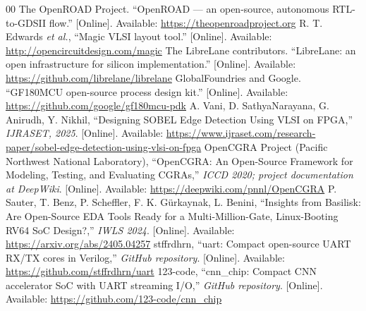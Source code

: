 \documentclass{ieeeaccess}
\begin{document}
\begin{thebibliography}{00}
 The OpenROAD Project. ``OpenROAD --- an open-source, autonomous RTL-to-GDSII flow.'' [Online]. Available: \url{https://theopenroadproject.org}
 R. T. Edwards \emph{et al.}, ``Magic VLSI layout tool.'' [Online]. Available: \url{http://opencircuitdesign.com/magic}
 The LibreLane contributors. ``LibreLane: an open infrastructure for silicon implementation.'' [Online]. Available: \url{https://github.com/librelane/librelane}
 GlobalFoundries and Google. ``GF180MCU open-source process design kit.'' [Online]. Available: \url{https://github.com/google/gf180mcu-pdk}
 A. Vani, D. SathyaNarayana, G. Anirudh, Y. Nikhil, ``Designing SOBEL Edge Detection Using VLSI on FPGA,'' \emph{IJRASET, 2025}. [Online]. Available: \url{https://www.ijraset.com/research-paper/sobel-edge-detection-using-vlsi-on-fpga}
 OpenCGRA Project (Pacific Northwest National Laboratory), ``OpenCGRA: An Open-Source Framework for Modeling, Testing, and Evaluating CGRAs,'' \emph{ICCD 2020; project documentation at DeepWiki}. [Online]. Available: \url{https://deepwiki.com/pnnl/OpenCGRA}
 P. Sauter, T. Benz, P. Scheffler, F. K. Gürkaynak, L. Benini, ``Insights from Basilisk: Are Open-Source EDA Tools Ready for a Multi-Million-Gate, Linux-Booting RV64 SoC Design?,'' \emph{IWLS 2024}. [Online]. Available: \url{https://arxiv.org/abs/2405.04257}
 stffrdhrn, ``uart: Compact open-source UART RX/TX cores in Verilog,'' \emph{GitHub repository}. [Online]. Available: \url{https://github.com/stffrdhrn/uart}
 123-code, ``cnn\_chip: Compact CNN accelerator SoC with UART streaming I/O,'' \emph{GitHub repository}. [Online]. Available: \url{https://github.com/123-code/cnn_chip}
\end{thebibliography}

\EOD
\end{document}
